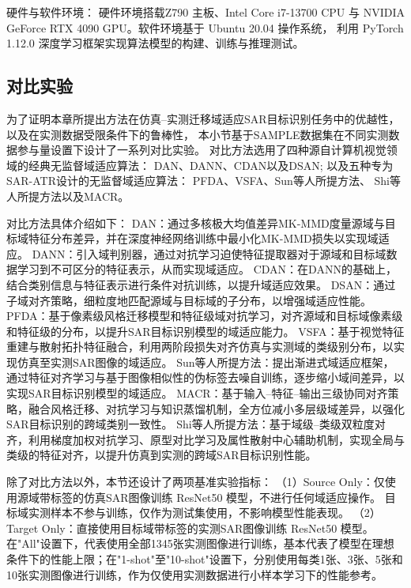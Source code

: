 硬件与软件环境：
硬件环境搭载Z790 主板、Intel Core i7-13700 CPU 与 NVIDIA GeForce RTX 4090 GPU。软件环境基于 Ubuntu 20.04 操作系统，
利用 PyTorch 1.12.0 深度学习框架实现算法模型的构建、训练与推理测试。



\subsection{对比实验}


为了证明本章所提出方法在仿真--实测迁移域适应SAR目标识别任务中的优越性，以及在实测数据受限条件下的鲁棒性，
本小节基于SAMPLE数据集在不同实测数据参与量设置下设计了一系列对比实验。
对比方法选用了四种源自计算机视觉领域的经典无监督域适应算法：
DAN\cite{long2015learning}、DANN\cite{ganin2015unsupervised}、CDAN\cite{long2018conditional}以及DSAN\cite{zhu2020deep};
以及五种专为SAR-ATR设计的无监督域适应算法：
PFDA\cite{chen2022pixel}、VSFA\cite{zhang2023vsfa}、Sun等人所提方法\cite{sun2023gradual}、
Shi等人所提方法\cite{shi2024unsupervised}以及MACR\cite{luan2025unsupervised}。

对比方法具体介绍如下：
DAN\cite{long2015learning}：通过多核极大均值差异MK-MMD度量源域与目标域特征分布差异，并在深度神经网络训练中最小化MK-MMD损失以实现域适应。
DANN\cite{ganin2015unsupervised}：引入域判别器，通过对抗学习迫使特征提取器对于源域和目标域数据学习到不可区分的特征表示，从而实现域适应。
CDAN\cite{long2018conditional}：在DANN的基础上，结合类别信息与特征表示进行条件对抗训练，以提升域适应效果。
DSAN\cite{zhu2020deep}：通过子域对齐策略，细粒度地匹配源域与目标域的子分布，以增强域适应性能。
PFDA\cite{chen2022pixel}：基于像素级风格迁移模型和特征级域对抗学习，对齐源域和目标域像素级和特征级的分布，以提升SAR目标识别模型的域适应能力。
VSFA\cite{zhang2023vsfa}：基于视觉特征重建与散射拓扑特征融合，利用两阶段损失对齐仿真与实测域的类级别分布，以实现仿真至实测SAR图像的域适应。
Sun等人所提方法\cite{sun2023gradual}：提出渐进式域适应框架，通过特征对齐学习与基于图像相似性的伪标签去噪自训练，逐步缩小域间差异，以实现SAR目标识别模型的域适应。
MACR\cite{luan2025unsupervised}：基于输入–特征–输出三级协同对齐策略，融合风格迁移、对抗学习与知识蒸馏机制，全方位减小多层级域差异，以强化SAR目标识别的跨域类别一致性。
Shi等人所提方法\cite{shi2024unsupervised}：基于域级–类级双粒度对齐，利用梯度加权对抗学习、原型对比学习及属性散射中心辅助机制，实现全局与类级的特征对齐，以提升仿真到实测的跨域SAR目标识别性能。

除了对比方法以外，本节还设计了两项基准实验指标：
（1）Source Only：仅使用源域带标签的仿真SAR图像训练 ResNet50 模型，不进行任何域适应操作。
目标域实测样本不参与训练，仅作为测试集使用，不影响模型性能表现。
（2）Target Only：直接使用目标域带标签的实测SAR图像训练 ResNet50 模型。在"All"设置下，代表使用全部1345张实测图像进行训练，基本代表了模型在理想条件下的性能上限；在"1-shot"至"10-shot"设置下，分别使用每类1张、3张、5张和10张实测图像进行训练，作为仅使用实测数据进行小样本学习下的性能参考。


